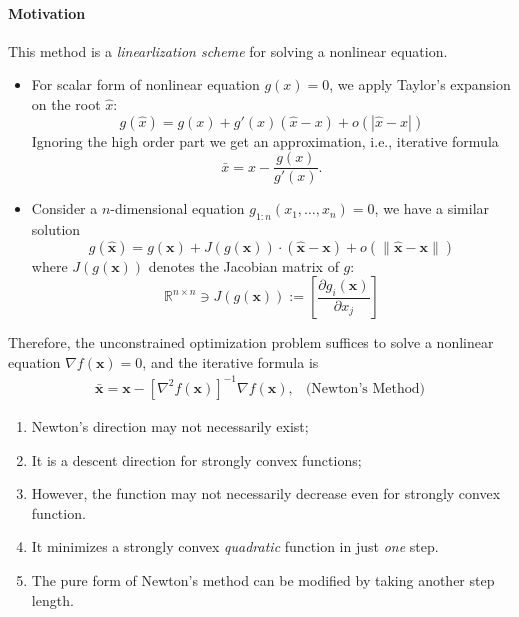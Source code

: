 \paragraph{Motivation}
This method is a \emph{linearlization scheme} for solving a nonlinear equation.
\begin{itemize}
\item
For scalar form of nonlinear equation $g(x)=0$, we apply Taylor's expansion on the root $\hat x$:
\[
g(\hat x) = g(x) + g'(x)(\hat x - x) + {o}(|\hat x-x|)
\]
Ignoring the high order part we get an approximation, i.e., iterative formula
\[
\bar x = x - \frac{g(x)}{g'(x)}.
\]
\item
Consider a $n$-dimensional equation $g_{1:n}(x_1,\dots,x_n) = 0$, we have a similar solution
\[
g(\hat{\bm x}) = g(\bm x) + J(g(\bm x))\cdot (\hat{\bm x} - \bm x) + {o}(\|\hat{\bm x}-\bm x\|)
\]
where $J(g(\bm x))$ denotes the Jacobian matrix of $g$:
\[\mathbb{R}^{n\times n}\ni
J(g(\bm x)):=\left[\frac{\partial g_i(\bm x)}{\partial x_j}\right]
\]
\end{itemize}
Therefore, the unconstrained optimization problem suffices to solve a nonlinear equation $\nabla f(\bm x)=0$, and the iterative formula is 
\[
\begin{array}{ll}
\bar{\bm x} = \bm x - [\nabla^2f(\bm x)]^{-1}\nabla f(\bm x),
&
\mbox{(Newton's Method)}
\end{array}
\]
\begin{remark}
\begin{enumerate}
\item
Newton’s direction may not necessarily exist;
\item
It is a descent direction for strongly convex functions;
\item
However, the function may not necessarily decrease even for strongly convex function.
\item
It minimizes a strongly convex \emph{quadratic} function in just \emph{one} step.
\item
The pure form of Newton's method can be modified by taking another step length.
\end{enumerate}
\end{remark}

